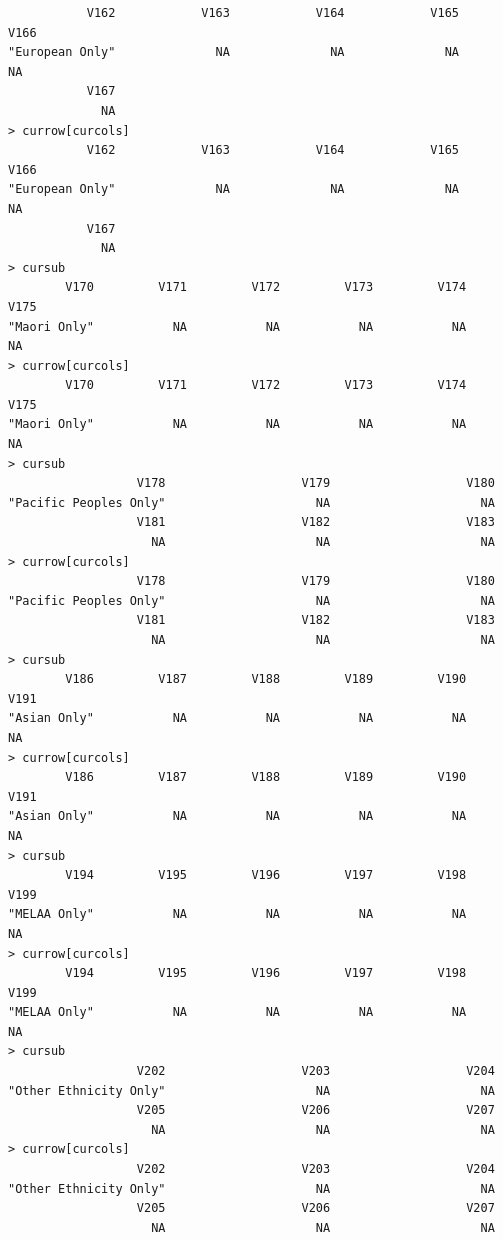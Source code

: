 \documentclass[a4paper]{article}
\begin{document}
\begin{verbatim}
           V162            V163            V164            V165            V166 
"European Only"              NA              NA              NA              NA 
           V167 
             NA 
> currow[curcols] 
           V162            V163            V164            V165            V166 
"European Only"              NA              NA              NA              NA 
           V167 
             NA 
> cursub 
        V170         V171         V172         V173         V174         V175 
"Maori Only"           NA           NA           NA           NA           NA 
> currow[curcols] 
        V170         V171         V172         V173         V174         V175 
"Maori Only"           NA           NA           NA           NA           NA 
> cursub 
                  V178                   V179                   V180 
"Pacific Peoples Only"                     NA                     NA 
                  V181                   V182                   V183 
                    NA                     NA                     NA 
> currow[curcols] 
                  V178                   V179                   V180 
"Pacific Peoples Only"                     NA                     NA 
                  V181                   V182                   V183 
                    NA                     NA                     NA 
> cursub 
        V186         V187         V188         V189         V190         V191 
"Asian Only"           NA           NA           NA           NA           NA 
> currow[curcols] 
        V186         V187         V188         V189         V190         V191 
"Asian Only"           NA           NA           NA           NA           NA 
> cursub 
        V194         V195         V196         V197         V198         V199 
"MELAA Only"           NA           NA           NA           NA           NA 
> currow[curcols] 
        V194         V195         V196         V197         V198         V199 
"MELAA Only"           NA           NA           NA           NA           NA 
> cursub 
                  V202                   V203                   V204 
"Other Ethnicity Only"                     NA                     NA 
                  V205                   V206                   V207 
                    NA                     NA                     NA 
> currow[curcols] 
                  V202                   V203                   V204 
"Other Ethnicity Only"                     NA                     NA 
                  V205                   V206                   V207 
                    NA                     NA                     NA 

\end{verbatim}
\end{document}

